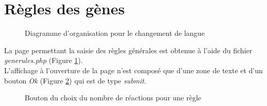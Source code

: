 \section{Règles des gènes}

\begin{figure}[!ht]
	\begin{center}
		\caption{Diagramme d'organisation pour le changement de langue}
  		\label{DiagRegles}
  	\end{center}	
\end{figure}

La page permettant la saisie des règles générales est obtenue à l'aide du fichier \emph{generules.php} (Figure \ref{DiagRegles}).\\
L'affichage à l'ouverture de la page n'est composé que d'une zone de texte et d'un bouton \emph{Ok} (Figure \ref{boutonOK}) qui est de type \textit{submit}. 

\begin{figure}[!ht]
	\begin{center}
		\caption{Bouton du choix du nombre de réactions pour une règle}
  		\label{boutonOK}
  	\end{center}	
\end{figure}

